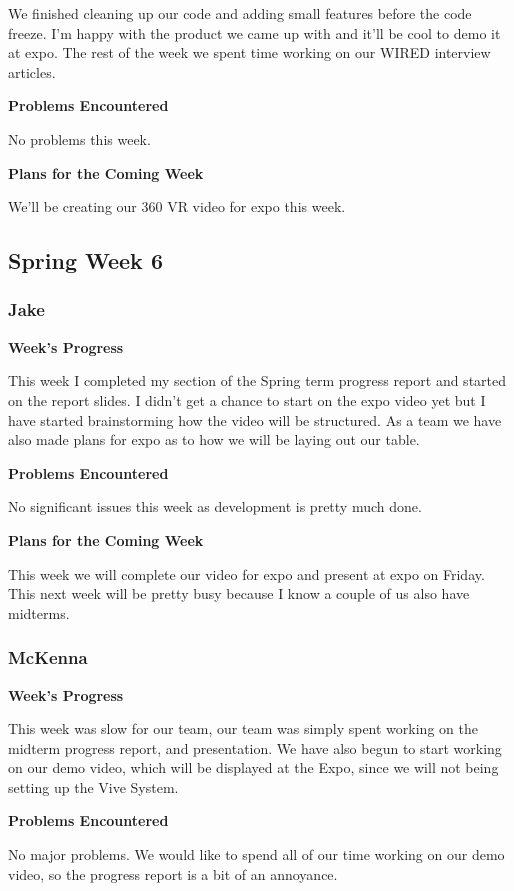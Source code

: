 \documentclass[10pt,journal,compsoc,onecolumn, draftclsnofoot]{IEEEtran}
\begin{document}
We finished cleaning up our code and adding small features before the code freeze. I'm happy with the product we came up with and it'll be cool to demo it at expo. The rest of the week we spent time working on our WIRED interview articles.

\noindent \textbf{Problems Encountered}

No problems this week.

\noindent \textbf{Plans for the Coming Week}

We'll be creating our 360 VR video for expo this week.

\subsection{Spring Week 6}
\subsubsection{Jake}
\noindent \textbf{Week's Progress}

This week I completed my section of the Spring term progress report and started on the report slides. I didn't get a chance to start on the expo video yet but I have started brainstorming how the video will be structured. As a team we have also made plans for expo as to how we will be laying out our table.

\noindent \textbf{Problems Encountered}

No significant issues this week as development is pretty much done.

\noindent \textbf{Plans for the Coming Week}

This week we will complete our video for expo and present at expo on Friday. This next week will be pretty busy because I know a couple of us also have midterms.

\subsubsection{McKenna}
\noindent \textbf{Week's Progress}

This week was slow for our team, our team was simply spent working on the midterm progress report, and presentation. We have also begun to start working on our demo video, which will be displayed at the Expo, since we will not being setting up the Vive System.

\noindent \textbf{Problems Encountered}

No major problems. We would like to spend all of our time working on our demo video, so the progress report is a bit of an annoyance.
\end{document}
